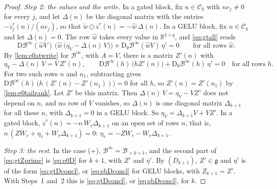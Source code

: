 \documentclass[10pt]{article}
\theoremstyle{definition}
\theoremstyle{remark}
\newcommand{\R}{\mathbb{R}}
\newcommand{\Der}{\mathrm{D}}
\begin{document}
\begin{proof}
\emph{Step 2: the values and the write.} In a gated block, fix $n \in \mathcal C_k$ with $ne_j \neq 0$ for every $j$, and let $\Delta(n)$ be the diagonal matrix with the entries $-\dot z^v_j(n)/(ne_j)$, so that $\tilde w\odot\dot z^v(n) = -\hat w\,\Delta(n)$. In a GELU block, fix $n \in \mathcal C_k$ and let $\Delta(n) = 0$. The row $\hat w$ takes every value in $\R^{1\times q}$, and \eqref{eq:gtall} reads
\[
\Der\mathcal B^\infty(\hat wV)\,\Big(\hat w\,\big(\eta_V - \Delta(n)\,V\big)\Big) + \Der_\theta\mathcal B^\infty(\hat wV)\,\eta' = 0 \qquad\text{for all rows } \hat w .
\]
By \cref{lem:e0atwrite} for $\mathcal B^\infty$, with $A = V$, there is a matrix $Z'(n)$ with
\begin{equation}\label{eq:gtZprime}
\eta_V - \Delta(n)\,V = V\,Z'(n), \qquad \Der\mathcal B^\infty(h)\,\big(hZ'(n)\big) + \Der_\theta\mathcal B^\infty(h)\,\eta' = 0 \quad\text{for all rows } h .
\end{equation}
For two such rows $n$ and $n_1$, subtracting gives $\Der\mathcal B^\infty(h)\,\big(h\,(Z'(n) - Z'(n_1))\big) = 0$ for all $h$, so $Z'(n) = Z'(n_1)$ by \cref{lem:e0tailrank}. Let $Z'$ be this matrix. Then $\Delta(n)\,V = \eta_V - VZ'$ does not depend on $n$, and no row of $V$ vanishes, so $\Delta(n)$ is one diagonal matrix $\Delta_{k+1}$ for all these $n$, with $\Delta_{k+1} = 0$ in a GELU block. So $\eta_V = \Delta_{k+1}V + VZ'$. In a gated block, $\dot z^v(n) = -n\,W_v\Delta_{k+1}$ on an open set of rows $n$, that is, $n\,(ZW_v + \eta_v + W_v\Delta_{k+1}) = 0$: $\eta_v = -ZW_v - W_v\Delta_{k+1}$.

\emph{Step 3: the rest.} In the case (+), $\mathcal B^\infty = \mathcal B_{>k+1}$, and the second part of \eqref{eq:gtZprime} is \eqref{eq:e0D} for $k+1$, with $Z'$ and $\eta'$. By $(D_{k+1})$, $Z' \in \mathfrak g$ and $\eta'$ is of the form \eqref{eq:gtDconcl}, or \eqref{eq:sbDconcl} for GELU blocks, with $Z_{k+1} = Z'$. With Steps~1 and~2 this is \eqref{eq:gtDconcl}, or \eqref{eq:sbDconcl}, for $k$.


\end{proof}
\end{document}
